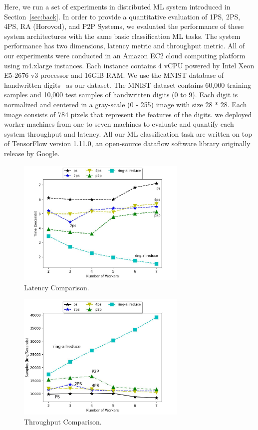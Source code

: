 \documentclass[conference]{IEEEtran}
\begin{document}
Here, we run a set of experiments in distributed ML system introduced in Section~\ref{sec:back}. In order to provide a quantitative evaluation of 1PS, 2PS, 4PS, RA (Horovod), and P2P Systems, we evaluated the performance of these system architectures with the same basic classification ML tasks. The system performance has two dimensions, latency metric and throughput metric.  All of our experiments were conducted in an Amazon EC2 cloud computing platform using m4.xlarge instances. Each instance contains 4 vCPU powered by Intel Xeon E5-2676 v3 processor and 16GiB RAM. We use the MNIST database of handwritten digits~\cite{MNIST} as our dataset. The MNIST dataset contains 60,000 training samples and 10,000 test samples of handwritten digits (0 to 9). Each digit is normalized and centered in a gray-scale (0 - 255) image with size 28 * 28. Each image consists of 784 pixels that represent the features of the digits. we deployed worker machines from one to seven machines to evaluate and quantify each system throughput and latency. All our ML classification task are written on top of TensorFlow version 1.11.0, an open-source dataflow software library originally release by Google.


\begin{figure}[htb]
  \includegraphics[width=3.2in]{Fig/clatency.jpg}
  \caption{Latency Comparison.}
  \label{fig:clatency}
\end{figure}

\begin{figure}[htb]
  \includegraphics[width=3.2in]{Fig/cthroughput.jpg}
  \caption{Throughput Comparison.}
  \label{fig:cthroughput}
\end{figure}
\end{document}
